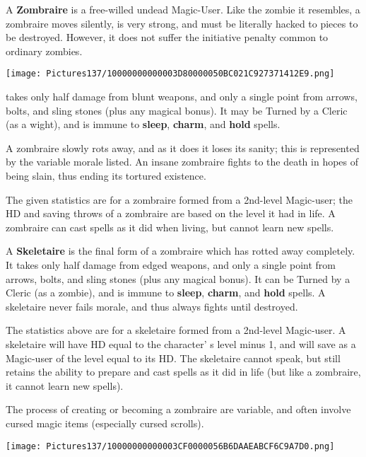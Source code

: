 \documentclass[a4paper,twoside,openany,10pt]{book}
\begin{document}
\begin{multicols}{2}
A \textbf{Zombraire} is a free-willed undead Magic-User. Like the zombie it resembles, a zombraire moves silently, is very strong, and must be literally hacked to pieces to be destroyed. However, it does not suffer the initiative penalty common to ordinary zombies.

\begin{center}
		\texttt{[image: Pictures137/10000000000003D80000050BC021C927371412E9.png]} \end{center}

takes only half damage from blunt weapons, and only a single point from arrows, bolts, and sling stones (plus any magical bonus). It may be Turned by a Cleric (as a wight), and is immune to \textbf{sleep},\textbf{ charm},\textbf{ }and\textbf{ hold} spells.

A zombraire slowly rots away, and as it does it loses its sanity; this is represented by the variable morale listed. An insane zombraire fights to the death in hopes of being slain, thus ending its tortured existence.

The given statistics are for a zombraire formed from a 2nd-level Magic-user; the HD and saving throws of a zombraire are based on the level it had in life. A zombraire can cast spells as it did when living, but cannot learn new spells.

A \textbf{Skeletaire} is the final form of a zombraire which has rotted away completely. It takes only half damage from edged weapons, and only a single point from arrows, bolts, and sling stones (plus any magical bonus). It can be Turned by a Cleric (as a zombie), and is immune to \textbf{sleep},\textbf{ charm}, and \textbf{hold} spells. A skeletaire never fails morale, and thus always fights until destroyed.

The statistics above are for a skeletaire formed from a 2nd-level Magic-user. A skeletaire will have HD equal to the character' s level minus 1, and will save as a Magic-user of the level equal to its HD. The skeletaire cannot speak, but still retains the ability to prepare and cast spells as it did in life (but like a zombraire, it cannot learn new spells). 

The process of creating or becoming a zombraire are variable, and often involve cursed magic items (especially cursed scrolls).

\end{multicols}

 \begin{center}
 \texttt{[image: Pictures137/10000000000003CF0000056B6DAAEABCF6C9A7D0.png]}
 \end{center}
\end{document}
